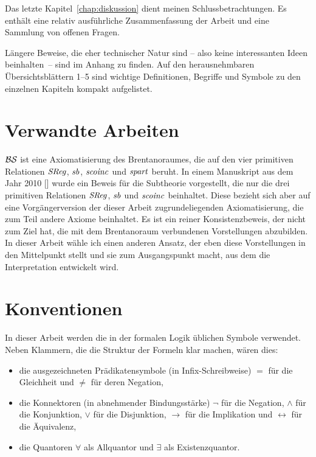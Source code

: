 Das
letzte Kapitel~\ref{chap:diskussion} dient meinen Schlussbetrachtungen.
Es enthält eine relativ ausführliche Zusammenfassung der Arbeit und eine Sammlung von offenen Fragen. %

Längere
Beweise, die eher technischer Natur sind -- also keine interessanten Ideen beinhalten~-- sind im Anhang zu finden.
Auf den herausnehmbaren Übersichtsblättern 1--5 sind wichtige Definitionen, Begriffe und Symbole zu den einzelnen Kapiteln kompakt aufgelistet.


\section{Verwandte Arbeiten}
$\mathcal{BS}$ ist eine Axiomatisierung des Brentanoraumes, die auf den vier primitiven Relationen $\mathit{S\hspace*{-0.25ex}Reg}$, $\mathit{sb}$, $\mathit{scoinc}$ und $\mathit{spart}$ beruht.
In einem Manuskript aus dem Jahr 2010 [\cite{baumann-r-2010-07-12-a}] wurde ein Beweis für die Subtheorie vorgestellt, die nur die drei primitiven Relationen $\mathit{S\hspace*{-0.25ex}Reg}$, $\mathit{sb}$ und $\mathit{scoinc}$ beinhaltet.
Diese bezieht sich aber auf eine Vorgängerversion der dieser Arbeit zugrundeliegenden Axiomatisierung, die zum Teil andere Axiome beinhaltet.
Es ist ein reiner Konsistenzbeweis, der nicht zum Ziel hat, die mit dem Brentanoraum verbundenen Vorstellungen abzubilden.
In dieser Arbeit wähle ich einen anderen Ansatz, der eben diese Vorstellungen in den Mittelpunkt stellt und sie zum Ausgangspunkt macht, aus dem die Interpretation entwickelt wird.


\section{Konventionen}
In dieser Arbeit werden die in der formalen Logik üblichen Symbole verwendet. Neben Klammern, die die Struktur der Formeln klar machen, wären dies:
\begin{itemize}
    \item 
        die ausgezeichneten Prädikatensymbole (in Infix-Schreibweise) $=$ für die Gleichheit und $\neq$ für deren Negation,
    \item 
        die Konnektoren (in abnehmender Bindungsstärke) $\neg$ für die Negation, $\land$ für die Konjunktion, $\lor$ für die Disjunktion, $\to$ für die Implikation und $\leftrightarrow$ für die Äquivalenz,
    \item 
        die Quantoren $\forall$ als Allquantor und $\exists$ als Existenzquantor.
\end{itemize}

